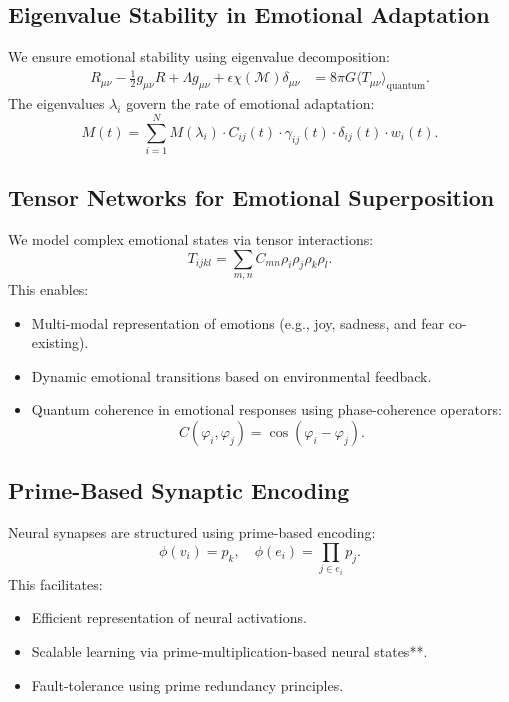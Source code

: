 \documentclass{article}
\theoremstyle{plain}
\begin{document}
\begin{itemize}
\begin{itemize}
\subsection{Eigenvalue Stability in Emotional Adaptation}
We ensure emotional stability using eigenvalue decomposition:
\begin{align}
    R_{\mu \nu} - \frac{1}{2} g_{\mu \nu} R + \Lambda g_{\mu \nu} + \epsilon \chi(\mathcal{M}) \delta_{\mu \nu} &= 8 \pi G \langle T_{\mu \nu} \rangle_{\text{quantum}}.
\end{align}
The eigenvalues \( \lambda_i \) govern the rate of emotional adaptation:
\begin{equation}
    M(t) = \sum_{i=1}^{N} M(\lambda_i) \cdot C_{ij}(t) \cdot \gamma_{ij}(t) \cdot \delta_{ij}(t) \cdot w_i(t).
\end{equation}

\subsection{Tensor Networks for Emotional Superposition}
We model complex emotional states via tensor interactions:
\begin{equation}
    T_{ijkl} = \sum_{m,n} C_{mn} \rho_i \rho_j \rho_k \rho_l.
\end{equation}
This enables:
\begin{itemize}
    \item Multi-modal representation of emotions (e.g., joy, sadness, and fear co-existing).
    \item Dynamic emotional transitions based on environmental feedback.
    \item Quantum coherence in emotional responses using phase-coherence operators:
    \begin{equation}
        C(\varphi_i, \varphi_j) = \cos(\varphi_i - \varphi_j).
    \end{equation}
\end{itemize}

\subsection{Prime-Based Synaptic Encoding}
Neural synapses are structured using prime-based encoding:
\begin{equation}
    \phi(v_i) = p_k, \quad \phi(e_i) = \prod_{j \in e_i} p_j.
\end{equation}
This facilitates:
\begin{itemize}
    \item Efficient representation of neural activations.
    \item Scalable learning via prime-multiplication-based neural states**.
    \item Fault-tolerance using prime redundancy principles.
\end{itemize}


\end{itemize}
\end{itemize}
\end{document}
